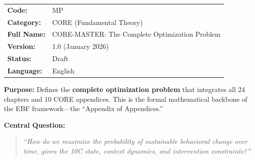 %
%
%


\begin{tcolorbox}[colback=gray!5!white, colframe=gray!75!black,
    title=Appendix Header: MP CORE-MASTER]

\begin{tabular}{@{}ll@{}}
\textbf{Code:} & MP \\
\textbf{Category:} & CORE (Fundamental Theory) \\
\textbf{Full Name:} & CORE-MASTER: The Complete Optimization Problem \\
\textbf{Version:} & 1.0 (January 2026) \\
\textbf{Status:} & Draft \\
\textbf{Language:} & English \\
\end{tabular}

\vspace{0.5em}
\textbf{Purpose:} Defines the \textbf{complete optimization problem} that integrates
all 24 chapters and 10 CORE appendices. This is the formal mathematical backbone
of the EBF framework---the ``Appendix of Appendices.''

\textbf{Central Question:}
\begin{quote}
\textit{``How do we maximize the probability of sustainable behavioral change
over time, given the 10C state, context dynamics, and intervention constraints?''}
\end{quote}

\end{tcolorbox}

